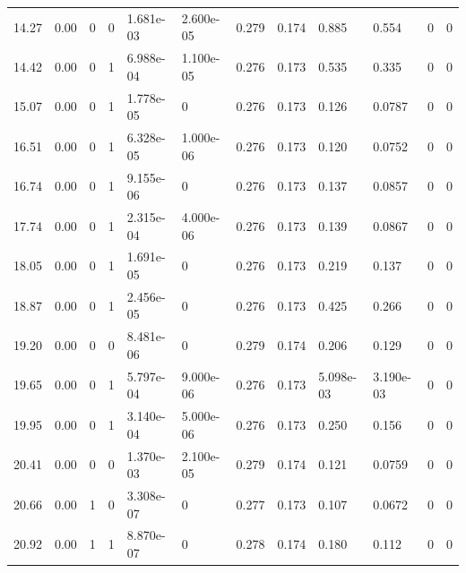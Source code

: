 \documentclass[preview]{standalone}
\begin{document}
{{\begin{tabular}{L{1.2cm}C{1.2cm} C{0.3cm}C{0.5cm} C{1.4cm}C{1.4cm} C{1.4cm}C{1.4cm} C{1.6cm}C{1.6cm} C{1.6cm}C{1.6cm}}
  14.27  &  0.00  & 0     &  0 &  1.681e-03  & 2.600e-05  &  0.279&   0.174& 0.885 & 0.554   &  0 & 0  \\ 
  14.42  &  0.00  & 0     &  1 &  6.988e-04  & 1.100e-05  &  0.276&   0.173& 0.535 & 0.335   &  0 & 0  \\ 
  15.07  &  0.00  & 0     &  1 &  1.778e-05  & 0  &  0.276&   0.173& 0.126 & 0.0787   &  0 & 0  \\ 
  16.51  &  0.00  & 0     &  1 &  6.328e-05  & 1.000e-06  &  0.276&   0.173& 0.120 & 0.0752   &  0 & 0  \\ 
  16.74  &  0.00  & 0     &  1 &  9.155e-06  & 0  &  0.276&   0.173& 0.137 & 0.0857   &  0 & 0  \\ 
  17.74  &  0.00  & 0     &  1 &  2.315e-04  & 4.000e-06  &  0.276&   0.173& 0.139 & 0.0867   &  0 & 0  \\ 
  18.05  &  0.00  & 0     &  1 &  1.691e-05  & 0  &  0.276&   0.173& 0.219 & 0.137   &  0 & 0  \\ 
  18.87  &  0.00  & 0     &  1 &  2.456e-05  & 0  &  0.276&   0.173& 0.425 & 0.266   &  0 & 0  \\ 
  19.20  &  0.00  & 0     &  0 &  8.481e-06  & 0  &  0.279&   0.174& 0.206 & 0.129   &  0 & 0  \\ 
  19.65  &  0.00  & 0     &  1 &  5.797e-04  & 9.000e-06  &  0.276&   0.173& 5.098e-03 & 3.190e-03   &  0 & 0  \\ 
  19.95  &  0.00  & 0     &  1 &  3.140e-04  & 5.000e-06  &  0.276&   0.173& 0.250 & 0.156   &  0 & 0  \\ 
  20.41  &  0.00  & 0     &  0 &  1.370e-03  & 2.100e-05  &  0.279&   0.174& 0.121 & 0.0759   &  0 & 0  \\ 
  20.66  &  0.00  & 1     &  0 &  3.308e-07  & 0  &  0.277&   0.173& 0.107 & 0.0672   &  0 & 0  \\ 
  20.92  &  0.00  & 1     &  1 &  8.870e-07  & 0  &  0.278&   0.174& 0.180 & 0.112   &  0 & 0  \\ 
\hline 
\end{tabular} 

}}
\end{document}
